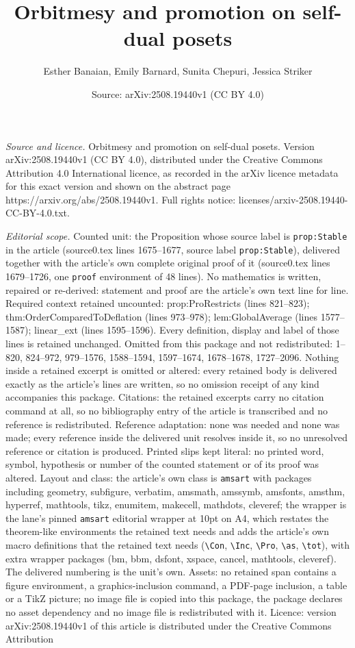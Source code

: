 \documentclass[10pt,a4paper]{amsart}
\title[Orbitmesy and promotion on self-dual posets]{Orbitmesy and promotion on self-dual posets}
\author{Esther Banaian, Emily Barnard, Sunita Chepuri, Jessica Striker}
\date{Source: arXiv:2508.19440v1 (CC BY 4.0)}
\begin{document}
\maketitle

\noindent\emph{Source and licence.} Orbitmesy and promotion on self-dual posets. Version arXiv:2508.19440v1 (CC BY 4.0), distributed under the Creative Commons Attribution 4.0 International licence, as recorded in the arXiv licence metadata for this exact version and shown on the abstract page https://arxiv.org/abs/2508.19440v1. Full rights notice: licenses/arxiv-2508.19440-CC-BY-4.0.txt.\par\smallskip

\noindent\textit{Editorial scope.} Counted unit: the Proposition whose source label is \texttt{prop:Stable} in the article (source0.tex lines 1675--1677, source label \texttt{prop:Stable}), delivered together with the article's own complete original proof of it (source0.tex lines 1679--1726, one \texttt{proof} environment of 48 lines). No mathematics is written, repaired or re-derived: statement and proof are the article's own text line for line. Required context retained uncounted: prop:ProRestricts (lines 821--823); thm:OrderComparedToDeflation (lines 973--978); lem:GlobalAverage (lines 1577--1587); linear\_ext (lines 1595--1596). Every definition, display and label of those lines is retained unchanged. Omitted from this package and not redistributed: 1--820, 824--972, 979--1576, 1588--1594, 1597--1674, 1678--1678, 1727--2096. Nothing inside a retained excerpt is omitted or altered: every retained body is delivered exactly as the article's lines are written, so no omission receipt of any kind accompanies this package. Citations: the retained excerpts carry no citation command at all, so no bibliography entry of the article is transcribed and no reference is redistributed. Reference adaptation: none was needed and none was made; every reference inside the delivered unit resolves inside it, so no unresolved reference or citation is produced. Printed slips kept literal: no printed word, symbol, hypothesis or number of the counted statement or of its proof was altered. Layout and class: the article's own class is \texttt{amsart} with packages including geometry, subfigure, verbatim, amsmath, amssymb, amsfonts, amsthm, hyperref, mathtools, tikz, enumitem, makecell, mathdots, cleveref; the wrapper is the lane's pinned \texttt{amsart} editorial wrapper at 10pt on A4, which restates the theorem-like environments the retained text needs and adds the article's own macro definitions that the retained text needs (\texttt{\textbackslash Con}, \texttt{\textbackslash Inc}, \texttt{\textbackslash Pro}, \texttt{\textbackslash as}, \texttt{\textbackslash tot}), with extra wrapper packages (bm, bbm, dsfont, xspace, cancel, mathtools, cleveref). The delivered numbering is the unit's own. Assets: no retained span contains a figure environment, a graphics-inclusion command, a PDF-page inclusion, a table or a TikZ picture; no image file is copied into this package, the package declares no asset dependency and no image file is redistributed with it. Licence: version arXiv:2508.19440v1 of this article is distributed under the Creative Commons Attribution 
\end{document}

